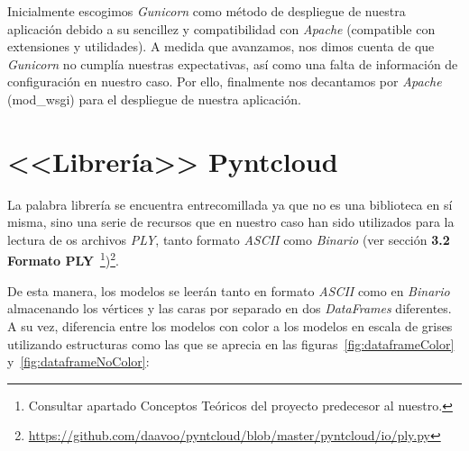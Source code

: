 Inicialmente escogimos \textit{Gunicorn} como método de despliegue de nuestra aplicación debido a su sencillez y compatibilidad con \textit{Apache} (compatible con extensiones y utilidades). A medida que avanzamos, nos dimos cuenta de que \textit{Gunicorn} no cumplía nuestras expectativas, así como una falta de información de configuración en nuestro caso. Por ello, finalmente nos decantamos por \textit{Apache} (mod\_wsgi) para el despliegue de nuestra aplicación.

\section{<<Librería>> Pyntcloud}
La palabra librería se encuentra entrecomillada ya que no es una biblioteca en sí misma, sino una serie de recursos que en nuestro caso han sido utilizados para la lectura de os archivos \textit{PLY}, tanto formato \textit{ASCII} como \textit{Binario} (ver sección \textbf{3.2 Formato PLY}~\cite{github:alberto-viewer}\footnote{Consultar apartado Conceptos Teóricos del proyecto predecesor al nuestro.})\footnote{\url{https://github.com/daavoo/pyntcloud/blob/master/pyntcloud/io/ply.py}}.

De esta manera, los modelos se leerán tanto en formato \textit{ASCII} como en \textit{Binario} almacenando los vértices y las caras por separado en dos \textit{DataFrames} diferentes. A su vez, diferencia entre los modelos con color a los modelos en escala de grises utilizando estructuras como las que se aprecia en las figuras~\ref{fig:dataframeColor} y~\ref{fig:dataframeNoColor}:
